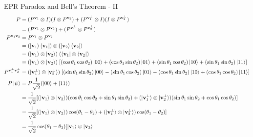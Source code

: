 \documentclass{beamer}
\begin{document}
\begin{frame}{EPR Paradox and Bell's Theorem - II\tiny{\cite{solutionofexercise420}}}
  {\tiny
    \begin{align*}
      P &= (P^{\mathbf{v}_1} \otimes I)(I \otimes P^{\mathbf{v}_2}) +
           (P^{\mathbf{v}_1^{\perp}} \otimes I) (I \otimes P^{\mathbf{v}_2^{\perp}}) \\
      &=
      (P^{\mathbf{v}_1} \otimes P^{\mathbf{v}_2}) +
      (P^{\mathbf{v}_1^{\perp}} \otimes P^{\mathbf{v}_2^{\perp}})
      \\
      P^{\mathbf{v}_1\mathbf{v}_2} &= P^{\mathbf{v}_1} \otimes P^{\mathbf{v}_2} \\
      &= (\ket{\mathbf{v}_1}\bra{\mathbf{v}_1}) \otimes (\ket{\mathbf{v}_2}\bra{\mathbf{v}_2}) \\
      &= (\ket{\mathbf{v}_1} \otimes \ket{\mathbf{v}_2}) \; (\bra{\mathbf{v}_1} \otimes \bra{\mathbf{v}_2}) \\
      &= (\ket{\mathbf{v}_1} \otimes \ket{\mathbf{v}_2}) \;
         [
           (\cos \theta_1 \cos \theta_2) \ket{00}
         + (\cos \theta_1 \sin \theta_2) \ket{01}
         + (\sin \theta_1 \cos \theta_2) \ket{10}
         + (\sin \theta_1 \sin \theta_2) \ket{11}
         ]
      \\
      P^{\mathbf{v}_1^{\perp} \mathbf{v}_2^{\perp}} &= 
         (\ket{\mathbf{v}_1^{\perp}} \otimes \ket{\mathbf{v}_2^{\perp}}) \;
         [
           (\sin \theta_1 \sin\theta_2) \ket{00}
         - (\sin \theta_1 \cos \theta_2) \ket{01}
         - (\cos \theta_1 \sin \theta_2) \ket{10}
         + (\cos \theta_1 \cos \theta_2) \ket{11}
         ]
      \\
      P\ket{\psi} &= P \frac{1}{\sqrt2} (\ket{00} + \ket{11}) \\
      &= \frac{1}{\sqrt2} 
                     [
                       (\ket{\mathbf{v}_1} \otimes \ket{\mathbf{v}_2}) (\cos \theta_1 \cos \theta_2 + \sin \theta_1 \sin \theta_2)
                     + (\ket{\mathbf{v}_1^{\perp}} \otimes \ket{\mathbf{v}_2^{\perp}}) (\sin \theta_1 \sin\theta_2 + \cos \theta_1 \cos \theta_2)
                     ] \\
      &= \frac{1}{\sqrt2} 
         [
           (\ket{\mathbf{v}_1} \otimes \ket{\mathbf{v}_2}) \cos (\theta_1 - \theta_2) 
         + (\ket{\mathbf{v}_1^{\perp}} \otimes \ket{\mathbf{v}_2^{\perp}}) \cos (\theta_1 - \theta_2)
         ] \\
      &= \frac{1}{\sqrt2} \cos (\theta_1 - \theta_2)
         [
           \ket{\mathbf{v}_1} \otimes \ket{\mathbf{v}_2}

\end{align*}}
\end{frame}
\end{document}
